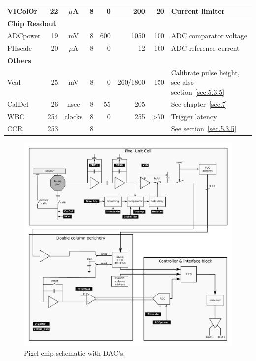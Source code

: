 \begin{table}[h]
\begin{center}
{\begin{tabular}{lrccrrrl}
	VIColOr     & 22 & $\mu$A  & 8 & 0 & 200 & 20 & Current limiter \\ 
	\midrule
	\multicolumn{ 8}{l}{\textbf{Chip Readout}} \\ 
	ADCpower    & 19 & mV & 8  & 600 & 1050 & 100 & ADC comparator voltage \\ 
	PHscale     & 20 & $\mu$A  & 8 & 0 & 12 & 160 & ADC reference current \\ 
	\midrule
	\multicolumn{ 8}{l}{\textbf{Others}} \\ 
	Vcal        & 25 & mV      & 8 & 0 & 260/1800 & 150 & Calibrate pulse height, see also section~\ref{sec.5.3.5} \\ 
	CalDel      & 26 & nsec    & 8 & 55 & 205 &  & See chapter~\ref{sec.7} \\ 
	WBC         & 254 & clocks & 8 & 0 & 255 &                 >70 & Trigger latency \\ 
	CCR         & 253 &        & 8 &  &  &  & See section~\ref{sec.5.3.5} \\ 
	\bottomrule
	\end{tabular}
	}
    \end{center}
\end{table}

\begin{figure}[hbtp]
	\begin{center}
	\includegraphics[width=.9\textwidth]{img/ROC_DACschema.pdf}
	\end{center}
	\caption{Pixel chip schematic with DAC's. }
	\label{fig:ROCDACschematic}
\end{figure}



